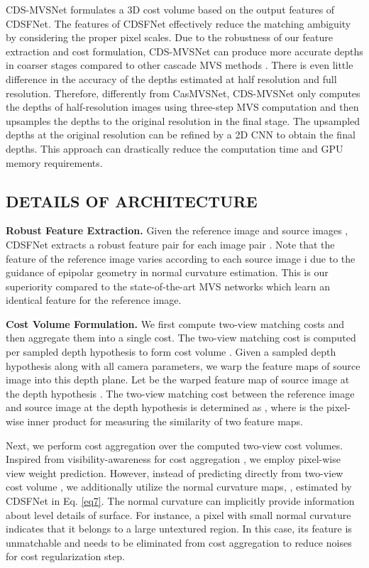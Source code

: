 \documentclass{article} \usepackage{iclr2022_conference,times}
\begin{document}
CDS-MVSNet formulates a 3D cost volume based on the output features of CDSFNet. The features of CDSFNet effectively reduce the matching ambiguity by considering the proper pixel scales. Due to the robustness of our feature extraction and cost formulation, CDS-MVSNet can produce more accurate depths in coarser stages compared to other cascade MVS methods \citep{gu2020cascade,cheng2020deep,yang2020cost,wang2021patchmatchnet}. There is even little difference in the accuracy of the depths estimated at half resolution and full resolution. Therefore, differently from CasMVSNet, CDS-MVSNet only computes the depths of half-resolution images using three-step MVS computation and then upsamples the depths to the original resolution in the final stage. The upsampled depths at the original resolution can be refined by a 2D CNN to obtain the final depths. This approach can drastically reduce the computation time and GPU memory requirements. \subsection{DETAILS OF ARCHITECTURE}
\label{three_step_MVS}
\textbf{Robust Feature Extraction.} Given the reference image  and  source images ,  CDSFNet extracts a robust feature pair  for each image pair . Note that the feature of the reference image  varies according to each source image i due to the guidance of epipolar geometry in normal curvature estimation. This is our superiority compared to the state-of-the-art MVS networks which learn an identical feature for the reference image.

\textbf{Cost Volume Formulation.} We first compute two-view matching costs and then aggregate them into a single cost. The two-view matching cost is computed per sampled depth hypothesis to form cost volume \citep{yao2018mvsnet,gu2020cascade,wang2021patchmatchnet}. Given a sampled depth hypothesis  along with all camera parameters, we warp the feature maps of source image  into this depth plane. Let  be the warped feature map of source image  at the depth hypothesis . The two-view matching cost  between the reference image  and source image  at the depth hypothesis  is determined as , where  is the pixel-wise inner product for measuring the similarity of two feature maps.

Next, we perform cost aggregation over the computed two-view cost volumes. Inspired from visibility-awareness for cost aggregation \citep{zhang2020visibility,xu2020pvsnet}, we employ pixel-wise view weight prediction. However, instead of predicting directly from two-view cost volume \citep{zhang2020visibility,xu2020pvsnet,yi2020pyramid}, we additionally utilize the normal curvature maps, , estimated by CDSFNet in Eq. \ref{eq7}. The normal curvature can implicitly provide information about level details of surface. For instance, a pixel with small normal curvature indicates that it belongs to a large untextured region. In this case, its feature is unmatchable and needs to be eliminated from cost aggregation to reduce noises for cost regularization step.
\end{document}

